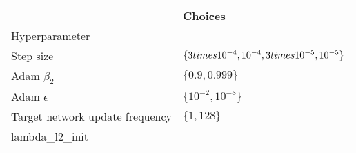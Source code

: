 \begin{tabular}{ll}
 & \bfseries Choices \\
Hyperparameter &  \\
Step size & $\{3 \\times 10^{-4}, 10^{-4}, 3 \\times 10^{-5}, 10^{-5}\}$ \\
Adam $\beta_2$ & $\{0.9, 0.999\}$ \\
Adam $\epsilon$ & $\{10^{-2}, 10^{-8}\}$ \\
Target network update frequency & $\{1, 128\}$ \\
lambda_l2_init &  \\
\end{tabular}
